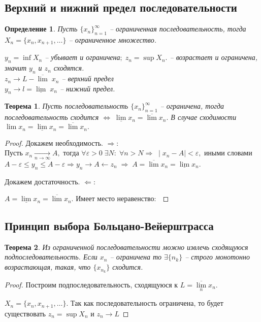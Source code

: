 \documentclass{article}
\newtheorem{Theorem}{Теорема}[section]
\newtheorem{Definition}{Определение}[section]
\begin{document}
\subsection{Верхний и нижний предел последовательности}
\begin{Definition}
Пусть $\{x_n\}_{n=1}^\infty$ -- ограниченная последовательность, тогда $X_n=\{x_n, x_{n+1},\ldots\}$ -- ограниченное множество.

$y_n=\inf X_n$ -- убывает и ограничена$; \;z_n=\sup X_n.$ -- возрастает и ограничена, значит $y_n$ и $z_n$ сходятся.\\
$z_n\rightarrow L-\overline{\lim} \;x_n$ -- верхний предел\\
$y_n\rightarrow l=\underline{\lim} \;x_n$ -- нижний предел.
\end{Definition}

\begin{Theorem}
Пусть последовательность $\{x_n\}_{n=1}^\infty$ -- ограничена, тогда последовательность сходится $\Leftrightarrow \; \underline{\lim} x_n=\overline{\lim} x_n.$ В случае сходимости $\lim x_n=\underline{\lim} x_n=\overline{\lim} x_n.$
\end{Theorem}
\begin{proof}
Докажем необходимость. $\Rightarrow:$\\
Пусть $x_n\xrightarrow[n\rightarrow\infty]{} A,$ тогда $\forall\varepsilon>0\;\exists N: \; \forall n>N\Rightarrow\;\mid x_n-A\mid<\varepsilon,$ иными словами $A-\varepsilon\leq y_n\leq A-\varepsilon\Rightarrow y_n\rightarrow A\leftarrow z_n \; \Rightarrow \; A=\overline{\lim} x_n =\underline{\lim} x_n.$

Докажем достаточность. $\Leftarrow:$

$A=\underline{\lim}x_n=\overline{\lim}x_n.$ Имеет место неравенство$: \; $%
\end{proof}
\subsection{Принцип выбора Больцано-Вейерштрасса}
\begin{Theorem}
Из ограниченной последовательности можно извлечь сходящуюся подпоследовательность. Если $x_n$ -- ограничена то $\exists\{n_k\}$ -- строго монотонно возрастающая, такая, что $\{x_{n_k}\}$ сходится.
\end{Theorem}
\begin{proof}
Построим подпоследовательность, сходящуюся к $L=\overline{\lim\limits_n}x_n.$

$X_n=\{x_n, x_{n+1},\ldots\}.$ Так как последовательность ограничена, то будет существовать $z_n=\sup X_n$ и $z_n\rightarrow L$
\end{proof}
\end{document}
